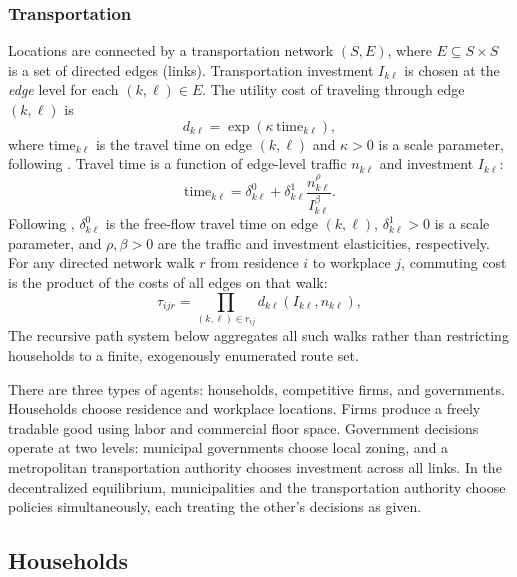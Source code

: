 \documentclass[12pt, a4paper]{article}
\theoremstyle{definition}
\theoremstyle{remark}
\begin{document}
\subsubsection{Transportation}
\label{sec:transportation}
Locations are connected by a transportation network $(S, E)$, where $E \subseteq S \times S$ is a set of directed edges (links). Transportation investment $I_{k\ell}$ is chosen at the \emph{edge} level for each $(k,\ell) \in E$. The utility cost of traveling through edge $(k,\ell)$ is
\[
d_{k\ell} = \exp\!\left(\kappa\,\mathrm{time}_{k\ell}\right),
\]
where $\mathrm{time}_{k\ell}$ is the travel time on edge $(k,\ell)$ and $\kappa > 0$ is a scale parameter, following \citet{Ahlfeldt2015-zb}. Travel time is a function of edge-level traffic $n_{k\ell}$ and investment $I_{k\ell}$:
\[
\mathrm{time}_{k\ell}
= \delta_{k\ell}^{0}
+\delta_{k\ell}^{1}\frac{n_{k\ell}^{\rho}}{I_{k\ell}^{\beta}}.
\]
Following \citet{Fajgelbaum2020-yv}, $\delta_{k\ell}^{0}$ is the free-flow travel time on edge $(k,\ell)$, $\delta_{k\ell}^{1} > 0$ is a scale parameter, and $\rho,\beta>0$ are the traffic and investment elasticities, respectively.
For any directed network walk $r$ from residence $i$ to workplace $j$, commuting cost is the product of the costs of all edges on that walk:
\[
\tau_{ijr} = \prod_{(k,\ell) \in r_{ij}} d_{k\ell}(I_{k\ell}, n_{k\ell}),
\]
The recursive path system below aggregates all such walks rather than restricting households to a finite, exogenously enumerated route set.

There are three types of agents: households, competitive firms, and governments. Households choose residence and workplace locations. Firms produce a freely tradable good using labor and commercial floor space. Government decisions operate at two levels: municipal governments choose local zoning, and a metropolitan transportation authority chooses investment across all links. In the decentralized equilibrium, municipalities and the transportation authority choose policies simultaneously, each treating the other's decisions as given.

\subsection{Households}
\label{sec:households}
\end{document}
